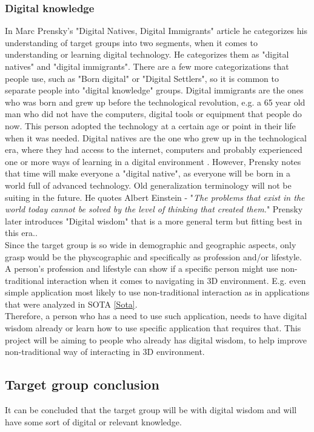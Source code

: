\subsubsection{Digital knowledge}
In Marc Prensky's "Digital Natives, Digital Immigrants" \cite{DigitalImmigrants} article he categorizes his understanding of target groups into two segments, when it comes to understanding or learning digital technology. He categorizes them as "digital natives" and "digital immigrants". There are a few more categorizations that people use, such as "Born digital" or "Digital Settlers", so it is common to separate people into "digital knowledge" groups.
Digital immigrants are the ones who was born and grew up before the technological revolution, e.g. a 65 year old man who did not have the computers, digital tools or equipment that people do now. This person adopted the technology at a certain age or point in their life when it was needed. 
Digital natives are the one who grew up in the technological era, where they had access to the internet, computers and probably experienced one or more ways of learning in a digital environment \cite{DigitalImmigrants}. However, Prensky notes that time will make everyone a "digital native", as everyone will be born in a world full of advanced technology. Old generalization terminology will not be suiting in the future. He quotes Albert Einstein - "\textit{The problems that exist in the world today cannot be solved by the level of thinking that created them.}" Prensky later introduces "Digital wisdom" that is a more general term but fitting best in this era.\cite{DigitalWisdom}. 
\\
Since the target group is so wide in demographic and geographic aspects, only grasp would be the physcographic and specifically as profession and/or lifestyle. A person's profession and lifestyle can show if a specific person might use non-traditional interaction when it comes to navigating in 3D environment. E.g. even simple application most likely to use non-traditional interaction as in applications that were analyzed in SOTA \ref{Sota}.
\\
Therefore, a person who has a need to use such application, needs to have digital wisdom already or learn how to use specific application that requires that. This project will be aiming to people who already has digital wisdom, to help improve non-traditional way of interacting in 3D environment.
\\
\subsection{Target group conclusion}
It can be concluded that the target group will be with digital wisdom and will have some sort of digital or relevant knowledge. 